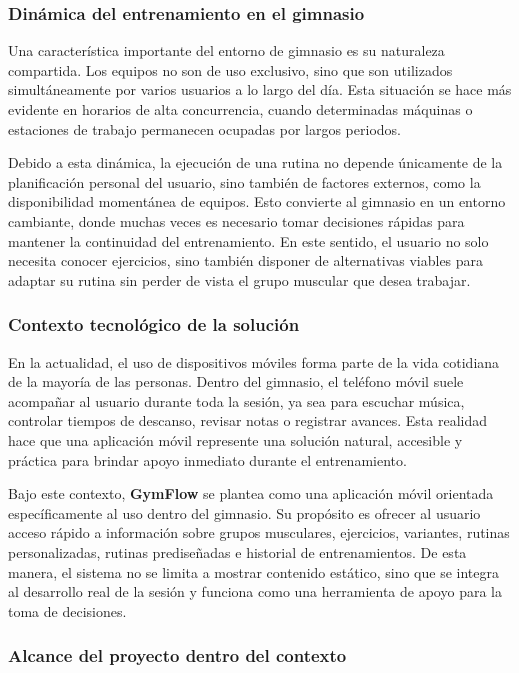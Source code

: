 \subsubsection{Dinámica del entrenamiento en el gimnasio}

Una característica importante del entorno de gimnasio es su naturaleza compartida. Los equipos no son de uso exclusivo, sino que son utilizados simultáneamente por varios usuarios a lo largo del día. Esta situación se hace más evidente en horarios de alta concurrencia, cuando determinadas máquinas o estaciones de trabajo permanecen ocupadas por largos periodos.

Debido a esta dinámica, la ejecución de una rutina no depende únicamente de la planificación personal del usuario, sino también de factores externos, como la disponibilidad momentánea de equipos. Esto convierte al gimnasio en un entorno cambiante, donde muchas veces es necesario tomar decisiones rápidas para mantener la continuidad del entrenamiento. En este sentido, el usuario no solo necesita conocer ejercicios, sino también disponer de alternativas viables para adaptar su rutina sin perder de vista el grupo muscular que desea trabajar.

\subsubsection{Contexto tecnológico de la solución}

En la actualidad, el uso de dispositivos móviles forma parte de la vida cotidiana de la mayoría de las personas. Dentro del gimnasio, el teléfono móvil suele acompañar al usuario durante toda la sesión, ya sea para escuchar música, controlar tiempos de descanso, revisar notas o registrar avances. Esta realidad hace que una aplicación móvil represente una solución natural, accesible y práctica para brindar apoyo inmediato durante el entrenamiento.

Bajo este contexto, \textbf{GymFlow} se plantea como una aplicación móvil orientada específicamente al uso dentro del gimnasio. Su propósito es ofrecer al usuario acceso rápido a información sobre grupos musculares, ejercicios, variantes, rutinas personalizadas, rutinas prediseñadas e historial de entrenamientos. De esta manera, el sistema no se limita a mostrar contenido estático, sino que se integra al desarrollo real de la sesión y funciona como una herramienta de apoyo para la toma de decisiones.

\subsubsection{Alcance del proyecto dentro del contexto}

